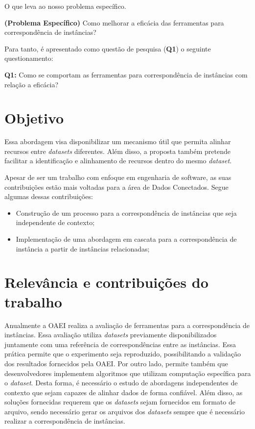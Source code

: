 O que leva ao nosso problema específico.

\textbf{(Problema Específico)} Como melhorar a eficácia das ferramentas para correspondência de instâncias?

Para tanto, é apresentado como questão de pesquisa (\textbf{Q1}) o seguinte questionamento:

\textbf{Q1:} Como se comportam as ferramentas para correspondência de instâncias com relação a eficácia?

\section{Objetivo}


Essa abordagem visa disponibilizar um mecanismo útil que permita alinhar recursos entre \textit{datasets} diferentes. Além disso, a proposta também pretende facilitar a identificação e alinhamento de recursos dentro do mesmo \textit{dataset}. 

Apesar de ser um trabalho com enfoque em engenharia de software, as suas contribuições estão mais voltadas para a área de Dados Conectados. Segue algumas dessas contribuições:

\begin{itemize}
        \item Construção de um processo para a correspondência de instâncias que seja independente de contexto;
        \item Implementação de uma abordagem em cascata para a correspondência de instância a partir de instâncias relacionadas;
\end{itemize}


\section{Relevância e contribuições do trabalho}
\label{contribuicao}
Anualmente a OAEI realiza a avaliação de ferramentas para a correspondência de instâncias. Essa avaliação utiliza \textit{datasets} previamente disponibilizados juntamente com uma referência de correspondências entre as instâncias. Essa prática permite que o experimento seja reproduzido, possibilitando a validação dos resultados fornecidos pela OAEI. Por outro lado, permite também que desenvolvedores implementem algoritmos que utilizam computação específica para o \textit{dataset}. Desta forma, é necessário o estudo de abordagens independentes de contexto que sejam capazes de alinhar dados de forma confiável. Além disso, as soluções fornecidas requerem que os \textit{datasets} sejam fornecidos em formato de arquivo, sendo necessário gerar os arquivos dos \textit{datasets} sempre que é necessário realizar a correspondência de instâncias.

